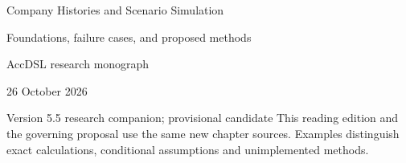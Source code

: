 \documentclass[11pt,a4paper]{report}
\begin{document}
\hypersetup{pageanchor=false}
\begin{titlepage}
{\Huge Company Histories and Scenario Simulation\par}
\vspace{12mm}
{\Large Foundations, failure cases, and proposed methods\par}
\vspace{8mm}
AccDSL research monograph\par 26 October 2026\par Version 5.5 research companion; provisional candidate
\vfill
This reading edition and the governing proposal use the same new chapter sources. Examples distinguish exact calculations, conditional assumptions and unimplemented methods.
\end{titlepage}
\hypersetup{pageanchor=true}
\tableofcontents
\clearpage{}


























\clearpage\label{sim:body-end}

\begingroup\raggedright
\endgroup
\end{document}
